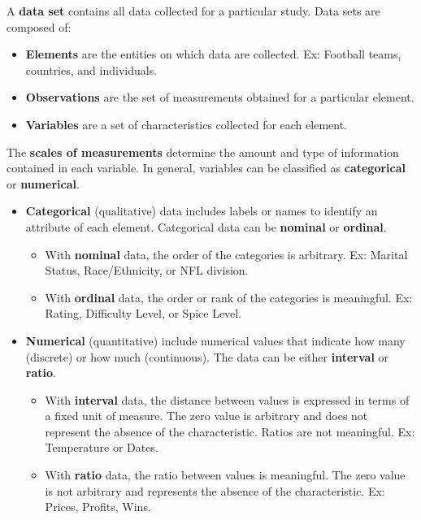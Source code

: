 \documentclass[
  letterpaper,
  DIV=11,
  numbers=noendperiod]{scrreprt}
\begin{document}
A \textbf{data set} contains all data collected for a particular study.
Data sets are composed of:

\begin{itemize}
\item
  \textbf{Elements} are the entities on which data are collected. Ex:
  Football teams, countries, and individuals.
\item
  \textbf{Observations} are the set of measurements obtained for a
  particular element.
\item
  \textbf{Variables} are a set of characteristics collected for each
  element.
\end{itemize}

The \textbf{scales of measurements} determine the amount and type of
information contained in each variable. In general, variables can be
classified as \textbf{categorical} or \textbf{numerical}.

\begin{itemize}
\item
  \textbf{Categorical} (qualitative) data includes labels or names to
  identify an attribute of each element. Categorical data can be
  \textbf{nominal} or \textbf{ordinal}.

  \begin{itemize}
  \item
    With \textbf{nominal} data, the order of the categories is
    arbitrary. Ex: Marital Status, Race/Ethnicity, or NFL division.
  \item
    With \textbf{ordinal} data, the order or rank of the categories is
    meaningful. Ex: Rating, Difficulty Level, or Spice Level.
  \end{itemize}
\item
  \textbf{Numerical} (quantitative) include numerical values that
  indicate how many (discrete) or how much (continuous). The data can be
  either \textbf{interval} or \textbf{ratio}.

  \begin{itemize}
  \item
    With \textbf{interval} data, the distance between values is
    expressed in terms of a fixed unit of measure. The zero value is
    arbitrary and does not represent the absence of the characteristic.
    Ratios are not meaningful. Ex: Temperature or Dates.
  \item
    With \textbf{ratio} data, the ratio between values is meaningful.
    The zero value is not arbitrary and represents the absence of the
    characteristic. Ex: Prices, Profits, Wins.
  \end{itemize}
\end{itemize}
\end{document}
